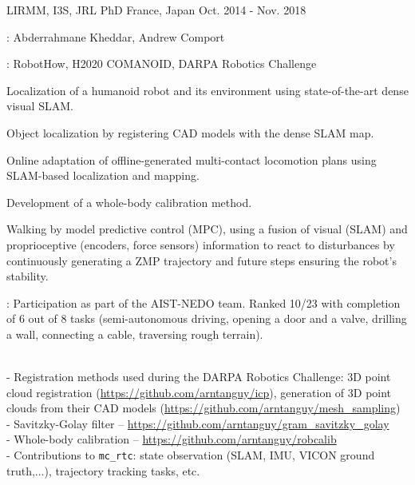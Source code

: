 \begin{cventries}
  \cventry
  {LIRMM, I3S, JRL} %
  {PhD} %
  {France, Japan} %
  {Oct. 2014 - Nov. 2018} %
  {
    \begin{cvitems} %
    \item {}: Abderrahmane Kheddar, Andrew Comport
    \item {}: RobotHow, H2020 COMANOID, DARPA Robotics Challenge
    \item Localization of a humanoid robot and its environment using state-of-the-art dense visual SLAM.
    \item Object localization by registering CAD models with the dense SLAM map.
    \item Online adaptation of offline-generated multi-contact locomotion plans using SLAM-based localization
      and mapping.
    \item Development of a whole-body calibration method.
    \item Walking by model predictive control (MPC), using a fusion of visual (SLAM) and proprioceptive
      (encoders, force sensors) information to react to disturbances by continuously generating a ZMP
      trajectory and future steps ensuring the robot's stability.
    \item {}: Participation as part of the AIST-NEDO
      team. Ranked 10/23 with completion of 6 out of 8 tasks (semi-autonomous driving, opening a door and a
      valve, drilling a wall, connecting a cable, traversing rough terrain).
    \item {}\\
      - Registration methods used during the DARPA Robotics Challenge: 3D point cloud registration
      (\url{https://github.com/arntanguy/icp}), generation of 3D point clouds from their CAD models
      (\url{https://github.com/arntanguy/mesh\_sampling})\\
      - Savitzky-Golay filter -- \url{https://github.com/arntanguy/gram_savitzky_golay}\\
      - Whole-body calibration -- \url{https://github.com/arntanguy/robcalib}\\
      - Contributions to {\tt mc\_rtc}: state observation (SLAM, IMU, VICON ground truth,...), trajectory
      tracking tasks, etc.
    \end{cvitems}
  }


\end{cventries}
